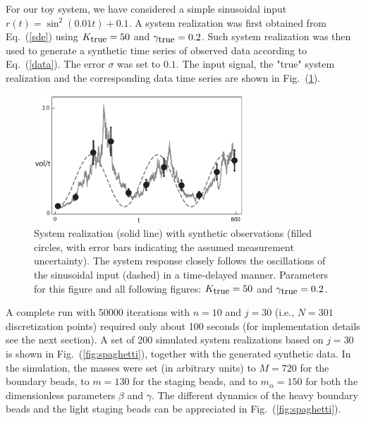 \documentclass[11pt]{article}
\theoremstyle{definition}
\begin{document}
For our toy system, we have considered a simple sinusoidal input  $r(t) = \sin^2 \left( 0.01 t \right) + 0.1$. A system realization was first obtained from Eq.~(\ref{sde}) using $K_{\mbox{\small true}} = 50$ and $\gamma_{\mbox{\small true}}=0.2$.
Such system realization was then used to generate a synthetic time series of observed data according to Eq.~(\ref{data}). The error $\sigma$ was set to $0.1$. The input signal, the "true" system realization and the corresponding data time series are shown in Fig.~(\ref{fig:rain_data_S}).
\begin{figure}[htb!]
    \centering
    \includegraphics[width=0.7\textwidth]{Fig2.pdf}
    \caption{\label{fig:rain_data_S}
    System realization (solid line) with synthetic observations (filled circles, with error bars indicating the assumed measurement uncertainty).
    The system response closely follows the oscillations of the sinusoidal input (dashed) in a time-delayed manner.
    Parameters for this figure and all following figures: $K_{\mbox{\small true}} = 50$ and $\gamma_{\mbox{\small true}} = 0.2$.
}
\end{figure}
A complete run with 50000 iterations with $n=10$ and $j=30$ (i.e., $N = 301$ discretization points) required only about 100 seconds (for implementation details see the next section). A set of 200 simulated system realizations based on $j=30$ is shown in Fig.~(\ref{fig:spaghetti}), together with the generated synthetic data. In the simulation, the masses were set (in arbitrary units) to $M=720$ for the boundary beads, to $m=130$ for the staging beads, and to $m_\alpha=150$ for both the dimensionless parameters $\beta$ and $\gamma$. The different dynamics of the heavy boundary beads and the light staging beads can be appreciated in Fig.~(\ref{fig:spaghetti}).
\end{document}
